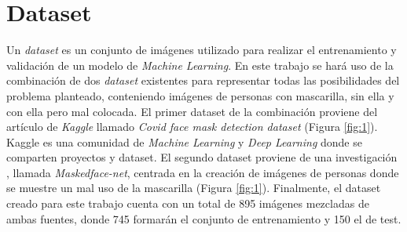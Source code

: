 \vspace{-0.7cm}
\section{Dataset} \label{dataset}
\vspace{-0.5cm}

Un \textit{dataset} es un conjunto de imágenes utilizado para realizar el entrenamiento y validación de un modelo de \textit{Machine Learning}. En este trabajo se hará uso de la combinación de dos \textit{dataset} existentes para representar todas las posibilidades del problema planteado, conteniendo imágenes de personas con mascarilla, sin ella y con ella pero mal colocada. El primer dataset de la combinación proviene del artículo de \textit{Kaggle} llamado \textit{Covid face mask detection dataset} \cite{datasetMask} (Figura \ref{fig:1}). Kaggle es una comunidad de \textit{Machine Learning} y \textit{Deep Learning} donde se comparten proyectos y dataset. El segundo dataset proviene de una investigación \cite{Cabani_2021}, llamada \textit{Maskedface-net}, centrada en la creación de imágenes de personas donde se muestre un mal uso de la mascarilla (Figura \ref{fig:1}). Finalmente, el dataset creado para este trabajo cuenta con un total de 895 imágenes mezcladas de ambas fuentes, donde 745 formarán el conjunto de entrenamiento y 150 el de test.

\vspace{0.3cm}

